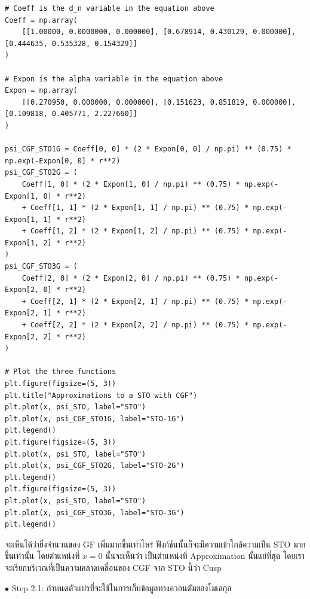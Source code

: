 \begin{lstlisting}[style=MyPython]
# Coeff is the d_n variable in the equation above
Coeff = np.array(
    [[1.00000, 0.0000000, 0.000000], [0.678914, 0.430129, 0.000000], [0.444635, 0.535328, 0.154329]]
)

# Expon is the alpha variable in the equation above
Expon = np.array(
    [[0.270950, 0.000000, 0.000000], [0.151623, 0.851819, 0.000000], [0.109818, 0.405771, 2.227660]]
)

psi_CGF_STO1G = Coeff[0, 0] * (2 * Expon[0, 0] / np.pi) ** (0.75) * np.exp(-Expon[0, 0] * r**2)
psi_CGF_STO2G = (
    Coeff[1, 0] * (2 * Expon[1, 0] / np.pi) ** (0.75) * np.exp(-Expon[1, 0] * r**2)
    + Coeff[1, 1] * (2 * Expon[1, 1] / np.pi) ** (0.75) * np.exp(-Expon[1, 1] * r**2)
    + Coeff[1, 2] * (2 * Expon[1, 2] / np.pi) ** (0.75) * np.exp(-Expon[1, 2] * r**2)
)
psi_CGF_STO3G = (
    Coeff[2, 0] * (2 * Expon[2, 0] / np.pi) ** (0.75) * np.exp(-Expon[2, 0] * r**2)
    + Coeff[2, 1] * (2 * Expon[2, 1] / np.pi) ** (0.75) * np.exp(-Expon[2, 1] * r**2)
    + Coeff[2, 2] * (2 * Expon[2, 2] / np.pi) ** (0.75) * np.exp(-Expon[2, 2] * r**2)
)

# Plot the three functions
plt.figure(figsize=(5, 3))
plt.title("Approximations to a STO with CGF")
plt.plot(x, psi_STO, label="STO")
plt.plot(x, psi_CGF_STO1G, label="STO-1G")
plt.legend()
plt.figure(figsize=(5, 3))
plt.plot(x, psi_STO, label="STO")
plt.plot(x, psi_CGF_STO2G, label="STO-2G")
plt.legend()
plt.figure(figsize=(5, 3))
plt.plot(x, psi_STO, label="STO")
plt.plot(x, psi_CGF_STO3G, label="STO-3G")
plt.legend()
\end{lstlisting}

\vspace{5pt}

จะเห็นได้ว่ายิ่งจำนวนของ GF เพิ่มมากขึ้นเท่าไหร่ ฟังก์ชันนั้นก็จะมีความเข้าใกล้ความเป็น STO มากขึ้นเท่านั้น โดยตำแหน่งที่ $x = 0$ นั้นจะเห็นว่า%
เป็นตำแหน่งที่ Approximation นั้นแย่ที่สุด โดยเราจะเรียกบริเวณที่เป็นความคลาดเคลื่อนของ CGF จาก STO นี้ว่า Cusp

\noindent {}

\noindent $\bullet$ Step 2.1: กำหนดตัวแปรที่จะใช้ในการเก็บข้อมูลทางควอนตัมของโมเลกุล

\vspace{5pt}

